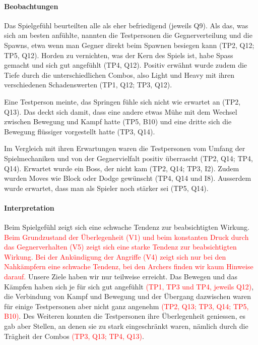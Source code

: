 \documentclass[../Main.tex]{subfiles}
\begin{document}
\paragraph{Beobachtungen}
Das Spielgefühl beurteilten alle als eher befriedigend (jeweils Q9). Als das, was sich am besten anfühlte, nannten die Testpersonen die Gegnerverteilung und die Spawns, etwa wenn man Gegner direkt beim Spawnen besiegen kann (TP2, Q12; TP5, Q12). Horden zu vernichten, was der Kern des Spiels ist, habe Spass gemacht und sich gut angefühlt (TP4, Q12). Positiv erwähnt wurde zudem die Tiefe durch die unterschiedlichen Combos, also Light und Heavy mit ihren verschiedenen Schadenswerten (TP1, Q12; TP3, Q12).

Eine Testperson meinte, das Springen fühle sich nicht wie erwartet an (TP2, Q13). Das deckt sich damit, dass eine andere etwas Mühe mit dem Wechsel zwischen Bewegung und Kampf hatte (TP5, B10) und eine dritte sich die Bewegung flüssiger vorgestellt hatte (TP3, Q14).

Im Vergleich mit ihren Erwartungen waren die Testpersonen vom Umfang der Spielmechaniken und von der Gegnervielfalt positiv überrascht (TP2, Q14; TP4, Q14). Erwartet wurde ein Boss, der nicht kam (TP2, Q14; TP3, I2). Zudem wurden Moves wie Block oder Dodge gewünscht (TP4, Q14 und I8). Ausserdem wurde erwartet, dass man als Spieler noch stärker sei (TP5, Q14).

\paragraph{Interpretation}
Beim Spielgefühl zeigt sich eine schwache Tendenz zur beabsichtigten Wirkung. \textcolor{red}{Beim Grundzustand der Überlegenheit (V1) und beim konstanten Druck durch das Gegnerverhalten (V5) zeigt sich eine starke Tendenz zur beabsichtigten Wirkung. Bei der Ankündigung der Angriffe (V4) zeigt sich nur bei den Nahkämpfern eine schwache Tendenz, bei den Archers finden wir kaum Hinweise darauf.} Unsere Ziele haben wir nur teilweise erreicht. Das Bewegen und das Kämpfen haben sich je für sich gut angefühlt \textcolor{red}{(TP1, TP3 und TP4, jeweils Q12)}, die Verbindung von Kampf und Bewegung und der Übergang dazwischen waren für einige Testpersonen aber nicht ganz angenehm \textcolor{red}{(TP2, Q13; TP3, Q14; TP5, B10)}. Des Weiteren konnten die Testpersonen ihre Überlegenheit geniessen, es gab aber Stellen, an denen sie zu stark eingeschränkt waren, nämlich durch die Trägheit der Combos \textcolor{red}{(TP3, Q13; TP4, Q13)}.
\end{document}
